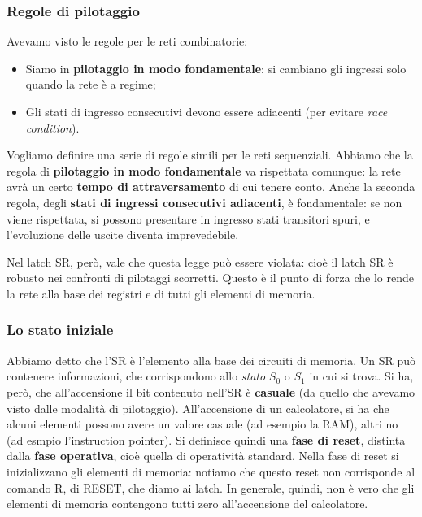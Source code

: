 \documentclass[a4paper,11pt]{article}
\begin{document}
\subsubsection{Regole di pilotaggio}
Avevamo visto le regole per le reti combinatorie:
\begin{itemize}
	\item Siamo in \textbf{pilotaggio in modo fondamentale}: si cambiano gli ingressi solo quando la rete è a regime;
	\item Gli stati di ingresso consecutivi devono essere adiacenti (per evitare \textit{race condition}).
\end{itemize}

Vogliamo definire una serie di regole simili per le reti sequenziali.
Abbiamo che la regola di \textbf{pilotaggio in modo fondamentale} va rispettata comunque: la rete avrà un certo \textbf{tempo di attraversamento} di cui tenere conto.
Anche la seconda regola, degli \textbf{stati di ingressi consecutivi adiacenti}, è fondamentale: se non viene rispettata, si possono presentare in ingresso stati transitori spuri, e l'evoluzione delle uscite diventa imprevedebile.

Nel latch SR, però, vale che questa legge può essere violata: cioè il latch SR è robusto nei confronti di pilotaggi scorretti.
Questo è il punto di forza che lo rende la rete alla base dei registri e di tutti gli elementi di memoria.

\subsubsection{Lo stato iniziale}
Abbiamo detto che l'SR è l'elemento alla base dei circuiti di memoria.
Un SR può contenere informazioni, che corrispondono allo \textit{stato} $S_0$ o $S_1$ in cui si trova.
Si ha, però, che all'accensione il bit contenuto nell'SR è \textbf{casuale} (da quello che avevamo visto dalle modalità di pilotaggio).
All'accensione di un calcolatore, si ha che alcuni elementi possono avere un valore casuale (ad esempio la RAM), altri no (ad esmpio l'instruction pointer).
Si definisce quindi una \textbf{fase di reset}, distinta dalla \textbf{fase operativa}, cioè quella di operatività standard.
Nella fase di reset si inizializzano gli elementi di memoria: notiamo che questo reset non corrisponde al comando R, di RESET, che diamo ai latch.
In generale, quindi, non è vero che gli elementi di memoria contengono tutti zero all'accensione del calcolatore.
\end{document}
